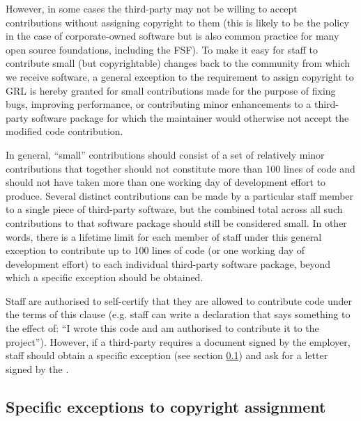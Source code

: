 \documentclass[10pt,a4paper]{article}
\begin{document}
\begin{itemize}
\par However, in some cases the third-party may not be willing to accept contributions 
without assigning copyright to them (this is likely to be the policy in the case of 
corporate-owned software but is also common practice for many open source 
foundations, including the FSF). To make it easy for staff to contribute small 
(but copyrightable) changes back to the community from which we receive 
software, a general exception to the requirement to assign copyright to GRL is 
hereby granted for small contributions made for the purpose of fixing bugs, 
improving performance, or contributing minor enhancements to a third-party 
software package for which the maintainer would otherwise not accept the 
modified code contribution. 

\par In general, ``small'' contributions should consist of a set of relatively minor 
contributions that together should not constitute more than 100 lines of code 
and should not have taken more than one working day of development effort 
to produce. Several distinct contributions can be made by a particular staff 
member to a single piece of third-party software, but the combined total across 
all such contributions to that software package should still be considered small. 
In other words, there is a lifetime limit for each member of staff under this general 
exception to contribute up to 100 lines of code (or one working day of 
development effort) to each individual third-party software package, beyond 
which a specific exception should be obtained. 

\par Staff are authorised to self-certify that they are allowed to contribute code 
under the terms of this clause (e.g. staff can write a declaration that says 
something to the effect of: ``I wrote this code and am authorised to contribute 
it to the project''). However, if a third-party requires a document signed 
by the employer, staff should obtain a specific exception (see 
section \ref{section:exceptions.special}) and ask for a letter signed by the \exectitle.

\end{itemize}


\subsection{Specific exceptions to copyright assignment}
\label{section:exceptions.special}
\end{document}

